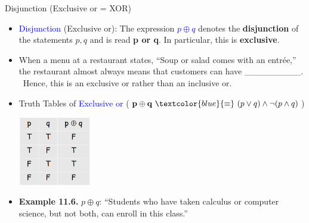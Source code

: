 \documentclass[aspectratio=169]{beamer}
\providecommand{\Blue}[1]{\textcolor{blue}{#1}}
\begin{document}
\begin{frame}[plain]{Disjunction (Exclusive or = XOR)}

\begin{itemize}[<+->]
 \item \Blue{Disjunction} (Exclusive or): The expression \Blue{$p\oplus q$} denotes the {\bf disjunction}
   of the statements $p, q$ and is read {\bf p or q}. In particular, this is {\bf exclusive}.
 \item When a menu at a restaurant states, ``Soup or salad comes with an entrée,''
      the restaurant almost always means that customers can have  
      \mbox{\_\_\_\_\_\_\_\_\_}.%
      \  Hence, this is an exclusive or rather than an inclusive or.
 \item Truth Tables of  \Blue{Exclusive or} 
   ($\mathbf{p\oplus q} \ \Blue{\equiv}\ (p\vee q)\wedge \neg(p\wedge q)$)
              \begin{center}
                \includegraphics[height=3cm]{./img/lecture11-fig5.png}
              \end{center}  
 \item {\bf Example 11.6.} $p\oplus q$: ``Students who have taken calculus or computer science, but not both,
            can enroll in this class.''
\end{itemize}
\end{frame}
\end{document}

